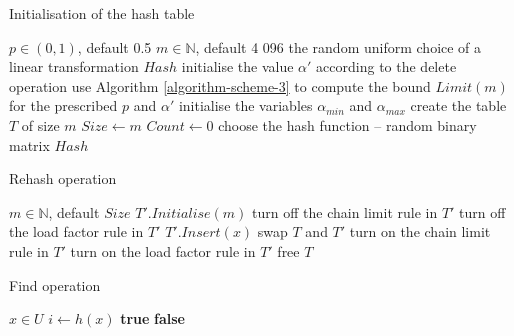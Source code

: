 \begin{algorithm}[H]
\caption{Initialisation of the hash table}
\label{algorithm-initialisation}
\begin{algorithmic}
\REQUIRE $p \in (0, 1)$, default 0.5
\REQUIRE $m \in \mathbb{N}$, default 4 096
\STATE
\ENSURE the random uniform choice of a linear transformation $Hash$
\STATE
\STATE initialise the value $\alpha'$ according to the delete operation
\STATE use Algorithm \ref{algorithm-scheme-3} to compute the bound $Limit(m)$ for the prescribed $p$ and $\alpha'$
\STATE initialise the variables $\alpha_{min}$ and $\alpha_{max}$
\STATE create the table $T$ of size $m$
\STATE $Size \leftarrow m$
\STATE $Count \leftarrow 0$
\STATE choose the hash function -- random binary matrix $Hash$
\end{algorithmic}
\end{algorithm}

\begin{algorithm}[H]
\caption{Rehash operation}
\label{algorithm-rehash}
\begin{algorithmic}
\REQUIRE $m \in \mathbb{N}$, default $Size$ 
\STATE
\REPEAT
	\STATE $T'.Initialise(m)$
	\STATE turn off the chain limit rule in $T'$
	\STATE turn off the load factor rule in $T'$
		\STATE $T'.Insert(x)$
	\ENDFOR
{}
\STATE
\STATE swap $T$ and $T'$
\STATE turn on the chain limit rule in $T'$
\STATE turn on the load factor rule in $T'$
\STATE free $T$
\end{algorithmic}
\end{algorithm}

\begin{algorithm}[H]
\caption{Find operation}
\label{algorithm-find}
\begin{algorithmic}
\REQUIRE $x \in U$
\STATE
$i \leftarrow h(x)$
	\RETURN \textbf{true} 
\ELSE
	\RETURN \textbf{false} 
\ENDIF
\end{algorithmic}
\end{algorithm}

